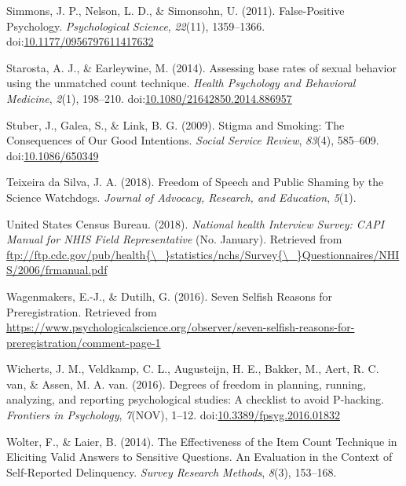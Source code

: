 \documentclass[jou]{apa6}
\theoremstyle{definition}
\theoremstyle{definition}
\theoremstyle{definition}
\theoremstyle{remark}
\begin{document}
\hypertarget{ref-Simmons2011}{}
Simmons, J. P., Nelson, L. D., \& Simonsohn, U. (2011). False-Positive
Psychology. \emph{Psychological Science}, \emph{22}(11), 1359--1366.
doi:\href{https://doi.org/10.1177/0956797611417632}{10.1177/0956797611417632}

\hypertarget{ref-Starosta2014}{}
Starosta, A. J., \& Earleywine, M. (2014). Assessing base rates of
sexual behavior using the unmatched count technique. \emph{Health
Psychology and Behavioral Medicine}, \emph{2}(1), 198--210.
doi:\href{https://doi.org/10.1080/21642850.2014.886957}{10.1080/21642850.2014.886957}

\hypertarget{ref-Stuber2009}{}
Stuber, J., Galea, S., \& Link, B. G. (2009). Stigma and Smoking: The
Consequences of Our Good Intentions. \emph{Social Service Review},
\emph{83}(4), 585--609.
doi:\href{https://doi.org/10.1086/650349}{10.1086/650349}

\hypertarget{ref-TeixeiradaSilva2018}{}
Teixeira da Silva, J. A. (2018). Freedom of Speech and Public Shaming by
the Science Watchdogs. \emph{Journal of Advocacy, Research, and
Education}, \emph{5}(1).

\hypertarget{ref-NHIS2006}{}
United States Census Bureau. (2018). \emph{National health Interview
Survey: CAPI Manual for NHIS Field Representative} (No. January).
Retrieved from
\href{ftp://ftp.cdc.gov/pub/health\%7B/_\%7Dstatistics/nchs/Survey\%7B/_\%7DQuestionnaires/NHIS/2006/frmanual.pdf}{ftp://ftp.cdc.gov/pub/health\{\textbackslash{}\_\}statistics/nchs/Survey\{\textbackslash{}\_\}Questionnaires/NHIS/2006/frmanual.pdf}

\hypertarget{ref-Wagenmakers2016}{}
Wagenmakers, E.-J., \& Dutilh, G. (2016). Seven Selfish Reasons for
Preregistration. Retrieved from
\url{https://www.psychologicalscience.org/observer/seven-selfish-reasons-for-preregistration/comment-page-1}

\hypertarget{ref-Wicherts2016}{}
Wicherts, J. M., Veldkamp, C. L., Augusteijn, H. E., Bakker, M., Aert,
R. C. van, \& Assen, M. A. van. (2016). Degrees of freedom in planning,
running, analyzing, and reporting psychological studies: A checklist to
avoid P-hacking. \emph{Frontiers in Psychology}, \emph{7}(NOV), 1--12.
doi:\href{https://doi.org/10.3389/fpsyg.2016.01832}{10.3389/fpsyg.2016.01832}

\hypertarget{ref-Wolter2014}{}
Wolter, F., \& Laier, B. (2014). The Effectiveness of the Item Count
Technique in Eliciting Valid Answers to Sensitive Questions. An
Evaluation in the Context of Self-Reported Delinquency. \emph{Survey
Research Methods}, \emph{8}(3), 153--168.
\end{document}
